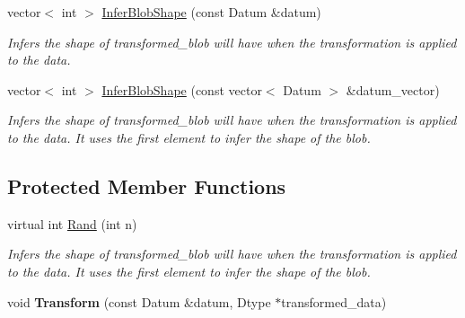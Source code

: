\begin{DoxyCompactItemize}
vector$<$ int $>$ \hyperlink{classcaffe_1_1DataTransformer_a1e43b0fb80cded5bb854e1a06004bebf}{Infer\+Blob\+Shape} (const Datum \&datum)
\begin{DoxyCompactList}\small\item\em Infers the shape of transformed\+\_\+blob will have when the transformation is applied to the data. \end{DoxyCompactList}\item 
vector$<$ int $>$ \hyperlink{classcaffe_1_1DataTransformer_ac829dd6448dcce67acb1e22a2554db4b}{Infer\+Blob\+Shape} (const vector$<$ Datum $>$ \&datum\+\_\+vector)
\begin{DoxyCompactList}\small\item\em Infers the shape of transformed\+\_\+blob will have when the transformation is applied to the data. It uses the first element to infer the shape of the blob. \end{DoxyCompactList}\end{DoxyCompactItemize}
\subsection*{Protected Member Functions}
\begin{DoxyCompactItemize}
\item 
virtual int \hyperlink{classcaffe_1_1DataTransformer_ac3e52731074a73b05ff0527d2febc8f2}{Rand} (int n)
\begin{DoxyCompactList}\small\item\em Infers the shape of transformed\+\_\+blob will have when the transformation is applied to the data. It uses the first element to infer the shape of the blob. \end{DoxyCompactList}\item 
void {\bfseries Transform} (const Datum \&datum, Dtype $\ast$transformed\+\_\+data)\hypertarget{classcaffe_1_1DataTransformer_a96c70b694d85f763934274e2fd92e6eb}{}\label{classcaffe_1_1DataTransformer_a96c70b694d85f763934274e2fd92e6eb}

\end{DoxyCompactItemize}
